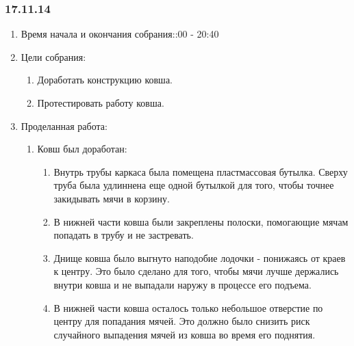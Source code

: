 
\subsubsection{17.11.14}

\begin{enumerate} 
	\item Время начала и окончания собрания::00 - 20:40
	\item Цели собрания:
	\begin{enumerate}
		\item Доработать конструкцию ковша.
		
		\item Протестировать работу ковша.
		
	\end{enumerate}
	
	\item Проделанная работа:
	\begin{enumerate}
		\item Ковш был доработан:
		\begin{enumerate}
			\item Внутрь трубы каркаса была помещена пластмассовая бутылка. Сверху труба была удлиннена еще одной бутылкой для того, чтобы точнее закидывать мячи в корзину.
			
			\item В нижней части ковша были закреплены полоски, помогающие мячам попадать в трубу и не застревать.
			
			\item Днище ковша было выгнуто наподобие лодочки - понижаясь от краев к центру. Это было сделано для того, чтобы мячи лучше держались внутри ковша и не выпадали наружу в процессе его подъема.
			
			\item В нижней части ковша осталось только небольшое отверстие по центру для попадания мячей. Это должно было снизить риск случайного выпадения мячей из ковша во время его поднятия.
			
		\end{enumerate}
		

\end{enumerate}
\end{enumerate}
